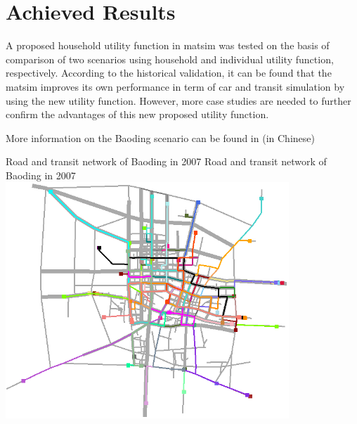 \section{Achieved Results}
A proposed household utility function in \gls{matsim} was tested on the basis of comparison of two scenarios using household and individual utility function, respectively. According to the historical validation, it can be found that the \gls{matsim} improves its own performance in term of car and transit simulation by using the new utility function. 
However, more case studies are needed to further confirm the advantages of this new proposed utility function.

More information on the Baoding scenario can be found in \citet[][]{Zhuge_PhDThesis_2014} (in Chinese) 

\createfigure%
{Road and transit network of Baoding in 2007}%
{Road and transit network of Baoding in 2007}%
{\label{fig:baoding_fig1}}%
{\includegraphics[width=0.8\textwidth, angle=0]{scenarios/figures/baoding_fig1.png}}%
{}

